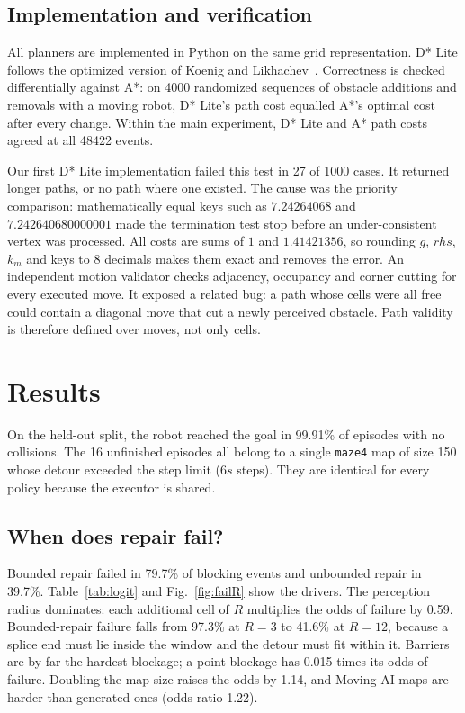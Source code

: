 \documentclass[11pt,a4paper]{article}
\begin{document}
\subsection{Implementation and verification}\label{sec:impl}
All planners are implemented in Python on the same grid representation. D* Lite follows the optimized version of Koenig and Likhachev~\cite{koenig2002dstarlite}. Correctness is checked differentially against A*: on \num{4000} randomized sequences of obstacle additions and removals with a moving robot, D* Lite's path cost equalled A*'s optimal cost after every change. Within the main experiment, D* Lite and A* path costs agreed at all \num{48422} events.

Our first D* Lite implementation failed this test in 27 of \num{1000} cases. It returned longer paths, or no path where one existed. The cause was the priority comparison: mathematically equal keys such as $7.24264068$ and $7.242640680000001$ made the termination test stop before an under-consistent vertex was processed. All costs are sums of $1$ and $1.41421356$, so rounding $g$, $rhs$, $k_m$ and keys to 8 decimals makes them exact and removes the error. An independent motion validator checks adjacency, occupancy and corner cutting for every executed move. It exposed a related bug: a path whose cells were all free could contain a diagonal move that cut a newly perceived obstacle. Path validity is therefore defined over moves, not only cells.

\section{Results}\label{sec:results}
On the held-out split, the robot reached the goal in 99.91\% of episodes with no collisions. The 16 unfinished episodes all belong to a single \texttt{maze4} map of size 150 whose detour exceeded the step limit ($6s$ steps). They are identical for every policy because the executor is shared.

\subsection{When does repair fail?}
Bounded repair failed in 79.7\% of blocking events and unbounded repair in 39.7\%. Table~\ref{tab:logit} and Fig.~\ref{fig:failR} show the drivers. The perception radius dominates: each additional cell of $R$ multiplies the odds of failure by 0.59. Bounded-repair failure falls from 97.3\% at $R=3$ to 41.6\% at $R=12$, because a splice end must lie inside the window and the detour must fit within it. Barriers are by far the hardest blockage; a point blockage has 0.015 times its odds of failure. Doubling the map size raises the odds by 1.14, and Moving AI maps are harder than generated ones (odds ratio 1.22).
\end{document}
